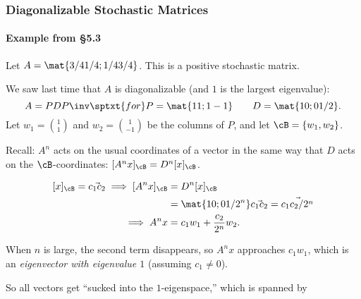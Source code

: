 \begin{frame}
\frametitle{Diagonalizable Stochastic Matrices}
\framesubtitle{Example from \S5.3}

\displayskips{3pt}%
Let $A = \mat{3/4 1/4; 1/4 3/4}$. This is a positive stochastic matrix.  

\pause\medskip
We saw last time that $A$ is diagonalizable (and $1$ is the largest eigenvalue):
\[ A = PDP\inv \sptxt{for} P = \mat{1 1; 1 -1} \qquad D = \mat{1 0; 0 1/2}. \]
\pause
Let $w_1 = {1\choose 1}$ and $w_2 = {1\choose -1}$ be the columns of $P$, and
let $\cB = \{w_1,w_2\}$.

\pause\medskip
\alert{Recall:} $A^n$ acts on the usual coordinates of a vector in the same way that
$D$ acts on the $\cB$-coordinates: $[A^nx]_\cB = D^n[x]_\cB$.
\begin{webonly}
\[\begin{split}
  [x]_\cB = \vec{c_1 c_2} 
  \implies [A^nx]_\cB &= D^n[x]_\cB \\
  &= \mat{1 0; 0 1/2^n}\vec{c_1 c_2}
  = \vec{c_1 c_2/2^n} \\
  \implies A^nx &= c_1w_1 + \frac{c_2}{2^n}w_2.
\end{split}\]
\end{webonly}%
\pause
When $n$ is large, the second term disappears, so $A^nx$ approaches $c_1w_1$,
which is an
\emph{eigenvector with eigenvalue $1$} (assuming $c_1\neq 0$).

\pause\medskip
So all vectors get ``sucked into the $1$-eigenspace,'' which is spanned by

\end{frame}



